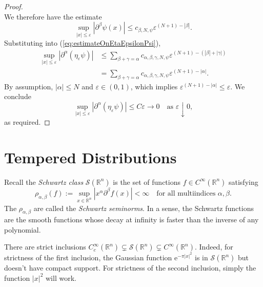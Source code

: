 \documentclass{book}
\newcommand{\scrS}{\mathscr{S}}
\newcommand{\bbR}{\mathbb{R}}
\newcommand{\e}{\mathrm{e}}
\renewcommand{\epsilon}{\varepsilon}
\newcommand{\abs}[1]{\left\lvert {#1} \right\rvert}
\theoremstyle{definition}
\theoremstyle{remark}
\numberwithin{equation}{chapter}
\begin{document}
\begin{proof}
\begin{equation}
    \end{equation}
    We therefore have the estimate 
    \begin{equation}
        \sup_{\abs{x} \leq \epsilon} \abs{\partial^\beta \psi(x)} \leq c_{\beta,N,\psi} \epsilon^{(N+1) - \abs{\beta}}.
    \end{equation}
    Substituting into (\ref{eq:estimateOnEtaEpsilonPsi}), 
    \begin{equation} \begin{aligned}
        \sup_{\abs{x} \leq \epsilon} \abs{\partial^\alpha(\eta_\epsilon \psi)} &\leq \sum_{\beta + \gamma = \alpha} c_{\alpha,\beta,\gamma,N,\psi} \epsilon^{(N+1) - (\abs{\beta} + \abs{\gamma})} \\
                                                                               &=    \sum_{\beta + \gamma = \alpha} c_{\alpha,\beta,\gamma,N,\psi} \epsilon^{(N+1) - \abs{\alpha}}.
    \end{aligned} \end{equation}
    By assumption, $\abs{\alpha} \leq N$ and $\epsilon \in (0,1)$, which implies $\epsilon^{(N+1) - \abs{\alpha}} \leq \epsilon$. We conclude 
    \begin{equation}
        \sup_{\abs{x} \leq \epsilon} \abs{\partial^\alpha(\eta_\epsilon \psi)} \leq C \epsilon \rightarrow 0 \quad \text{as } \epsilon \downarrow 0,
    \end{equation}
    as required.
\end{proof}

\section{Tempered Distributions}
Recall the \textit{Schwartz class} $\scrS(\bbR^n)$ is the set of functions $f \in C^\infty(\bbR^n)$ satisfying 
\begin{equation}
    \rho_{\alpha,\beta}(f) := \sup_{x \in \bbR^n} \abs{x^\alpha \partial^\beta f(x)} < \infty \quad \text{for all multiindices } \alpha,\beta.
\end{equation}
The $\rho_{\alpha,\beta}$ are called the \textit{Schwartz seminorms}. In a sense, the Schwartz functions are the smooth functions whose decay at infinity is faster than the inverse of any polynomial.

There are strict inclusions $C_c^\infty(\bbR^n) \subsetneq \scrS(\bbR^n) \subsetneq C^\infty(\bbR^n)$. Indeed, for strictness of the first inclusion, the Gaussian function $\e^{-\pi\abs{x}^2}$ is in $\scrS(\bbR^n)$ but doesn't have compact support. For strictness of the second inclusion, simply the function $\abs{x}^2$ will work.
\end{document}
